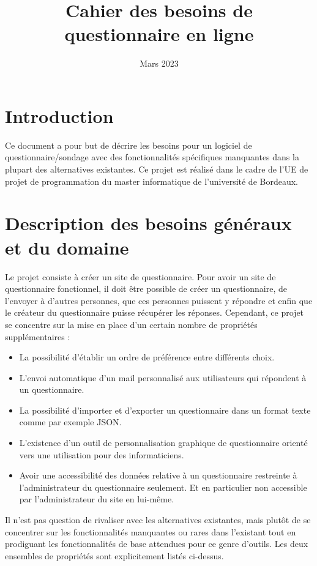 \documentclass{article}
\title{Cahier des besoins de questionnaire en ligne}
\date{Mars 2023}
\begin{document}
\maketitle

\section{Introduction}
Ce document a pour but de décrire les besoins pour un logiciel de questionnaire/sondage avec des fonctionnalités spécifiques manquantes dans la plupart des alternatives existantes. Ce projet est réalisé dans le cadre de l'UE de projet de programmation du master informatique de l'université de Bordeaux.

\section{Description des besoins généraux et du domaine}
Le projet consiste à créer un site de questionnaire. Pour avoir un site de questionnaire fonctionnel, il doit être possible de créer un questionnaire, de l'envoyer à d'autres personnes, que ces personnes puissent y répondre et enfin que le créateur du questionnaire puisse récupérer les réponses. Cependant, ce projet se concentre sur la mise en place d'un certain nombre de propriétés supplémentaires :
\begin{itemize}[noitemsep]
\item La possibilité d'établir un ordre de préférence entre différents choix.
\item L'envoi automatique d'un mail personnalisé aux utilisateurs qui répondent à un questionnaire.
\item La possibilité d'importer et d'exporter un questionnaire dans un format texte comme par exemple JSON.
\item L'existence d'un outil de personnalisation graphique de questionnaire orienté vers une utilisation pour des informaticiens.
\item Avoir une accessibilité des données relative à un questionnaire restreinte à l'administrateur du questionnaire seulement. Et en particulier non accessible par l'administrateur du site en lui-même.
\end{itemize}
Il n'est pas question de rivaliser avec les alternatives existantes, mais plutôt de se concentrer sur les fonctionnalités manquantes ou rares dans l'existant tout en prodiguant les fonctionnalités de base attendues pour ce genre d'outils. Les deux ensembles de propriétés sont explicitement listés ci-dessus.
\end{document}
